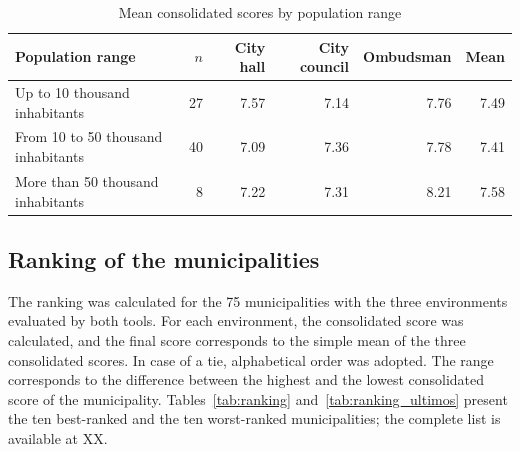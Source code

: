 \documentclass[12pt]{article}
\begin{document}
\begin{table}[ht]
\centering
\caption{Mean consolidated scores by population range}
\label{tab:faixas}
\small
\begin{tabular}{lrrrrr}
\toprule
\textbf{Population range} & \textbf{$n$} & \textbf{City hall} & \textbf{City council} & \textbf{Ombudsman} & \textbf{Mean} \\
\midrule
Up to 10 thousand inhabitants        & 27 & 7.57 & 7.14 & 7.76 & 7.49 \\
From 10 to 50 thousand inhabitants   & 40 & 7.09 & 7.36 & 7.78 & 7.41 \\
More than 50 thousand inhabitants    &  8 & 7.22 & 7.31 & 8.21 & 7.58 \\
\bottomrule
\end{tabular}
\end{table}

\subsection{Ranking of the municipalities}
\label{sec:ranking}

The ranking was calculated for the 75 municipalities with the three environments evaluated by both tools. For each environment, the consolidated score was calculated, and the final score corresponds to the simple mean of the three consolidated scores. In case of a tie, alphabetical order was adopted. The range corresponds to the difference between the highest and the lowest consolidated score of the municipality. Tables~\ref{tab:ranking} and~\ref{tab:ranking_ultimos} present the ten best-ranked and the ten worst-ranked municipalities; the complete list is available at XX.
\end{document}
